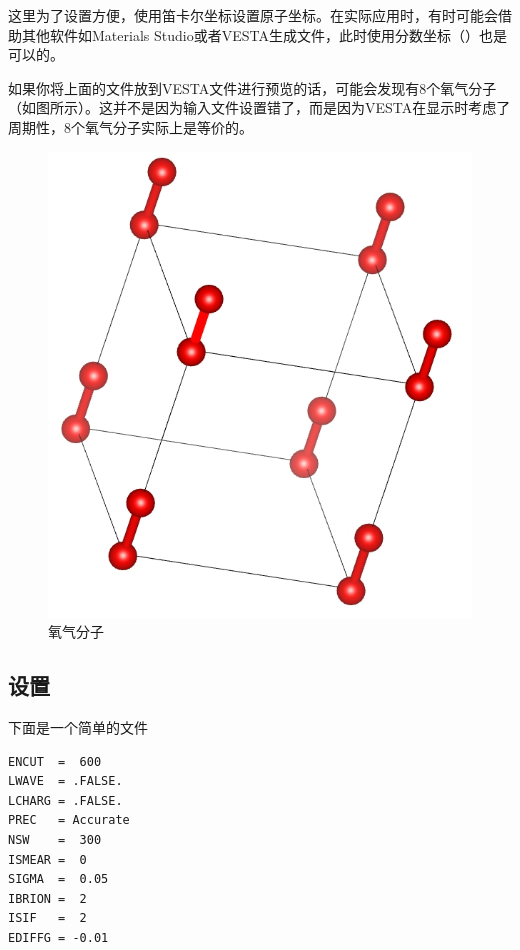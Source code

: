 这里为了设置方便，使用笛卡尔坐标设置原子坐标。在实际应用时，有时可能会借助其他软件如Materials Studio或者VESTA生成文件，此时使用分数坐标（）也是可以的。

\begin{extend}
    如果你将上面的文件放到VESTA文件进行预览的话，可能会发现有8个氧气分子（如图所示）。这并不是因为输入文件设置错了，而是因为VESTA在显示时考虑了周期性，8个氧气分子实际上是等价的。

    \begin{figure}
        \centering
        \includegraphics[width=0.5\linewidth]{VASP计算/结构优化/对坐标进行优化/fig/氧气分子.png}
        \caption{氧气分子}
        \label{fig:对坐标进行优化ISIF=2-氧气分子}
    \end{figure}
\end{extend}

\subsection{设置}\label{subsec:对坐标进行优化ISIF=2-INCAR设置}

下面是一个简单的文件

\begin{lstlisting}[caption=INCAR]
ENCUT  =  600
LWAVE  = .FALSE.
LCHARG = .FALSE.
PREC   = Accurate
NSW    =  300
ISMEAR =  0
SIGMA  =  0.05
IBRION =  2
ISIF   =  2
EDIFFG = -0.01
\end{lstlisting}

